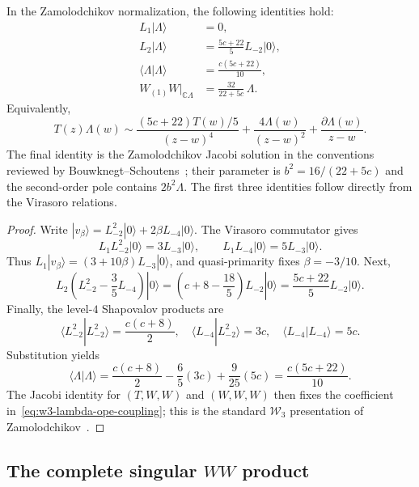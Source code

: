 \begin{theorem}
\label{thm:lambda-coefficients-derivation}
In the Zamolodchikov normalization, the following identities hold:
\begin{align}
L_1|\Lambda\rangle&=0,\label{eq:lambda-L1}\\
L_2|\Lambda\rangle&=\frac{5c+22}{5}L_{-2}|0\rangle,
\label{eq:lambda-L2}\\
\langle\Lambda|\Lambda\rangle&=\frac{c(5c+22)}{10},
\label{eq:lambda-norm}\\
W_{(1)}W\big|_{\mathbb C\Lambda}
&=\frac{32}{22+5c}\,\Lambda.
\label{eq:w3-lambda-ope-coupling}
\end{align}
Equivalently,
\begin{equation}\label{eq:T-lambda-ope}
T(z)\Lambda(w)\sim
\frac{(5c+22)T(w)/5}{(z-w)^4}
+\frac{4\Lambda(w)}{(z-w)^2}
+\frac{\partial\Lambda(w)}{z-w}.
\end{equation}
The final identity is the Zamolodchikov Jacobi solution
\cite{Zamolodchikov} in the conventions reviewed by
Bouwknegt--Schoutens~\cite[\S3.1]{Bouwknegt-Schoutens}; their
parameter is $b^2=16/(22+5c)$ and the second-order pole contains
$2b^2\Lambda$.  The first three identities
follow directly from the Virasoro relations.
\end{theorem}

\begin{proof}
Write
$|v_\beta\rangle=L_{-2}^2|0\rangle+2\beta L_{-4}|0\rangle$.
The Virasoro commutator gives
\[
L_1L_{-2}^2|0\rangle=3L_{-3}|0\rangle,
\qquad
L_1L_{-4}|0\rangle=5L_{-3}|0\rangle.
\]
Thus $L_1|v_\beta\rangle=(3+10\beta)L_{-3}|0\rangle$,
and quasi-primarity fixes $\beta=-3/10$.
Next,
\[
L_2\left(L_{-2}^2-\frac35L_{-4}\right)|0\rangle
=\left(c+8-\frac{18}{5}\right)L_{-2}|0\rangle
=\frac{5c+22}{5}L_{-2}|0\rangle.
\]
Finally, the level-$4$ Shapovalov products are
\[
\langle L_{-2}^2|L_{-2}^2\rangle=\frac{c(c+8)}2,
\quad
\langle L_{-4}|L_{-2}^2\rangle=3c,
\quad
\langle L_{-4}|L_{-4}\rangle=5c.
\]
Substitution yields
\[
\langle\Lambda|\Lambda\rangle
=\frac{c(c+8)}2-\frac65(3c)+\frac9{25}(5c)
=\frac{c(5c+22)}{10}.
\]
The Jacobi identity for $(T,W,W)$ and $(W,W,W)$ then fixes the
coefficient in~\eqref{eq:w3-lambda-ope-coupling}; this is the
standard $\mathcal W_3$ presentation of
Zamolodchikov~\cite{Zamolodchikov}.
\end{proof}

\subsection{The complete singular $WW$ product}

